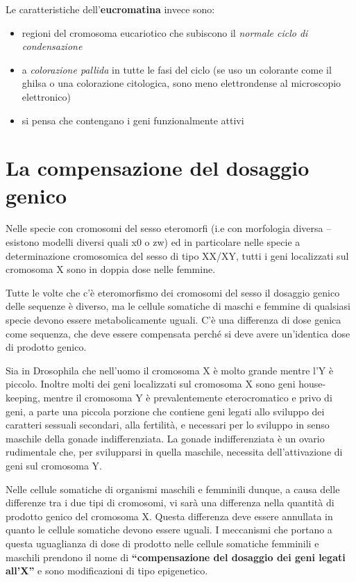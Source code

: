 \documentclass[11pt]{book}
\begin{document}
Le caratteristiche dell'\textbf{eucromatina} invece sono:
\begin{itemize}
\item regioni del cromosoma eucariotico che subiscono il \emph{normale ciclo di condensazione}
\item a \emph{colorazione pallida} in tutte le fasi del ciclo (se uso un colorante come il ghilsa o una colorazione citologica, sono meno elettrondense al microscopio elettronico)
\item si pensa che contengano i geni funzionalmente attivi
\end{itemize}

\section{La compensazione del dosaggio genico}
Nelle specie con cromosomi del sesso eteromorfi (i.e con morfologia diversa – esistono modelli diversi quali x0 o zw) ed in particolare nelle specie a determinazione cromosomica del sesso di tipo XX/XY, tutti i geni localizzati sul cromosoma X sono in doppia dose nelle femmine. 

Tutte le volte che c’è eteromorfismo dei cromosomi del sesso il dosaggio genico delle sequenze è diverso, ma le cellule somatiche di maschi e femmine di qualsiasi specie devono essere metabolicamente uguali. C’è una differenza di dose genica come sequenza, che deve essere compensata perché si deve avere un’identica dose di prodotto genico.
 
Sia in Drosophila che nell'uomo il cromosoma X è molto grande mentre l’Y è piccolo. Inoltre molti dei geni localizzati sul cromosoma X sono geni house-keeping, mentre il cromosoma Y è prevalentemente eterocromatico e privo di geni, a parte una piccola porzione che contiene geni legati allo sviluppo dei caratteri sessuali secondari, alla fertilità, e necessari per lo sviluppo in senso maschile della gonade indifferenziata. La gonade indifferenziata è un ovario rudimentale che, per svilupparsi in quella maschile, necessita dell’attivazione di geni sul cromosoma Y.

Nelle cellule somatiche di organismi maschili e femminili dunque, a causa delle differenze tra i due tipi di cromosomi, vi sarà una differenza nella quantità di prodotto genico del cromosoma X. Questa differenza deve essere annullata in quanto le cellule somatiche devono essere uguali. I meccanismi che portano a questa uguaglianza di dose di prodotto nelle cellule somatiche femminili e maschili prendono il nome di \textbf{``compensazione del dosaggio dei geni legati all’X''} e sono modificazioni di tipo epigenetico.
\end{document}

